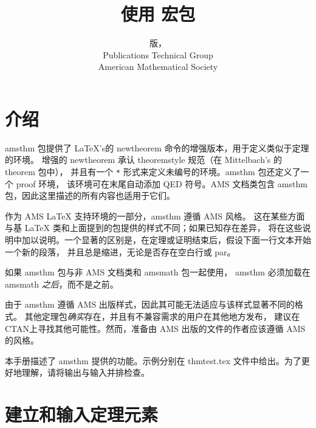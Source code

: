 \documentclass{article}
\title{使用 \pkg{amsthm} 宏包}
\author{\instrversion{} 版，\instrdate\\[.5ex]
 Publications Technical Group\\American Mathematical Society}
\date{}
\newcommand{\ntt}{%
  \fontfamily\ttdefault \fontseries\mddefault \fontshape\updefault
  \selectfont
}
\DeclareRobustCommand{\cn}[1]{{\ntt\bslchar#1}}
\DeclareRobustCommand{\pkg}[1]{\textsf{#1}}
\DeclareRobustCommand{\env}[1]{{\ntt#1}}
\DeclareRobustCommand{\fn}[1]{{\ntt#1}}
\def\latex/{{\protect\LaTeX}}
\begin{document}
\maketitle

\begingroup
\small
\tableofcontents
\endgroup


\newpage %

\section{介绍}

\begin{sloppypar}
\pkg{amsthm} 包提供了 \latex/'s的 \cn{newtheorem} 命令的增强版本，用于定义类似于定理的环境。
增强的 \cn{newtheorem} 承认 \cn{theoremstyle} 规范（在 Mittelbach's 的 \pkg{theorem} 包中），
并且有一个 \verb+*+ 形式来定义未编号的环境。\pkg{amsthm} 包还定义了一个 \env{proof} 环境，
该环境可在末尾自动添加 QED 符号。AMS 文档类包含 \pkg{amsthm} 包，因此这里描述的所有内容也适用于它们。
\end{sloppypar}

作为 AMS \latex/ 支持环境的一部分，\pkg{amsthm} 遵循 AMS 风格。
这在某些方面与基 \latex/ 类和上面提到的包提供的样式不同；如果已知存在差异，
将在这些说明中加以说明。一个显著的区别是，在定理或证明结束后，假设下面一行文本开始一个新的段落，
并且总是缩进，无论是否存在空白行或 \cn{par}。

如果 \pkg{amsthm} 包与非 AMS 文档类和 \pkg{amsmath} 包一起使用，
\pkg{amsthm} 必须加载在 \pkg{amsmath} \emph{之后}，而不是之前。

由于 \pkg{amsthm} 遵循 AMS 出版样式，因此其可能无法适应与该样式显著不同的格式。
其他定理包\emph{确实}存在，并且有不兼容需求的用户在其他地方发布，
建议在 CTAN\@ 上寻找其他可能性。然而，准备由 AMS 出版的文件的作者应该遵循 AMS 的风格。

本手册描述了 \pkg{amsthm} 提供的功能。示例分别在 \fn{thmtest.tex} 文件中给出。为了更好地理解，请将输出与输入并排检查。


\section{建立和输入定理元素}
\end{document}
